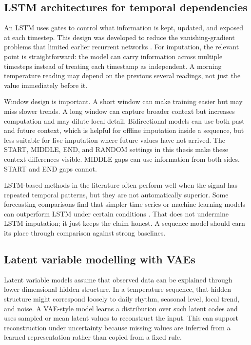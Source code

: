 \subsection{LSTM architectures for temporal dependencies}

An LSTM uses gates to control what information is kept, updated, and exposed at each timestep. This design was developed to reduce the vanishing-gradient problems that limited earlier recurrent networks \cite{Hochreiter1997}. For imputation, the relevant point is straightforward: the model can carry information across multiple timesteps instead of treating each timestamp as independent. A morning temperature reading may depend on the previous several readings, not just the value immediately before it.

Window design is important. A short window can make training easier but may miss slower trends. A long window can capture broader context but increases computation and may dilute local detail. Bidirectional models can use both past and future context, which is helpful for offline imputation inside a sequence, but less suitable for live imputation where future values have not arrived. The START, MIDDLE, END, and RANDOM settings in this thesis make these context differences visible. MIDDLE gaps can use information from both sides. START and END gaps cannot.

LSTM-based methods in the literature often perform well when the signal has repeated temporal patterns, but they are not automatically superior. Some forecasting comparisons find that simpler time-series or machine-learning models can outperform LSTM under certain conditions \cite{RoseroMontalvo2023TimeSeriesFT,Wu2024}. That does not undermine LSTM imputation; it just keeps the claim honest. A sequence model should earn its place through comparison against strong baselines.

\subsection{Latent variable modelling with VAEs}

Latent variable models assume that observed data can be explained through lower-dimensional hidden structure. In a temperature sequence, that hidden structure might correspond loosely to daily rhythm, seasonal level, local trend, and noise. A VAE-style model learns a distribution over such latent codes and uses sampled or mean latent values to reconstruct the input. This can support reconstruction under uncertainty because missing values are inferred from a learned representation rather than copied from a fixed rule.


